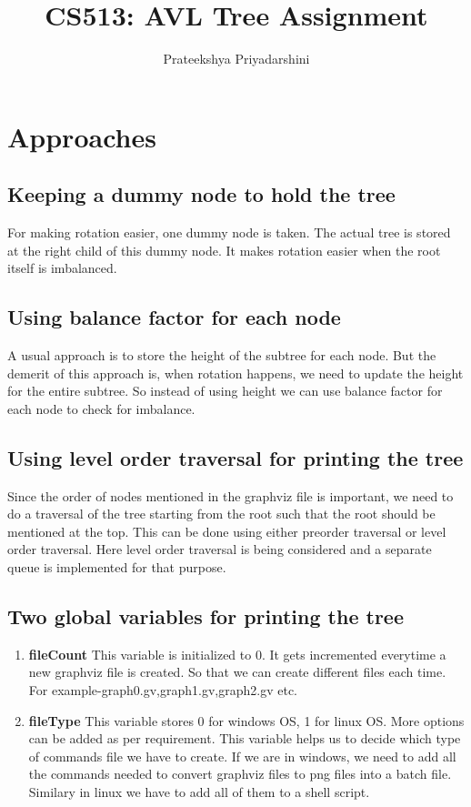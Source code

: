 \documentclass{article}
\title{CS513: AVL Tree Assignment}
\date{}
\author{Prateekshya Priyadarshini}
\affil{M.Tech CSE}
\begin{document}
\tableofcontents
\newpage
{}
\maketitle

\section{Approaches}
\subsection{Keeping a dummy node to hold the tree}
For making rotation easier, one dummy node is taken. The actual tree is stored at the right child of this dummy node. It makes rotation easier when the root itself is imbalanced.

\subsection{Using balance factor for each node}
A usual approach is to store the height of the subtree for each node. But the demerit of this approach is, when rotation happens, we need to update the height for the entire subtree. So instead of using height we can use balance factor for each node to check for imbalance.

\subsection{Using level order traversal for printing the tree}
Since the order of nodes mentioned in the graphviz file is important, we need to do a traversal of the tree starting from the root such that the root should be mentioned at the top. This can be done using either preorder traversal or level order traversal. Here level order traversal is being considered and a separate queue is implemented for that purpose.

\subsection{Two global variables for printing the tree}
\begin{enumerate}
	\item \textbf{fileCount}\newline
	This variable is initialized to 0. It gets incremented everytime a new graphviz file is created. So that we can create different files each time. For example-graph0.gv,graph1.gv,graph2.gv etc.
	\item \textbf{fileType}\newline
	This variable stores 0 for windows OS, 1 for linux OS. More options can be added as per requirement. This variable helps us to decide which type of commands file we have to create. If we are in windows, we need to add all the commands needed to convert graphviz files to png files into a batch file. Similary in linux we have to add all of them to a shell script.
\end{enumerate}
\end{document}
